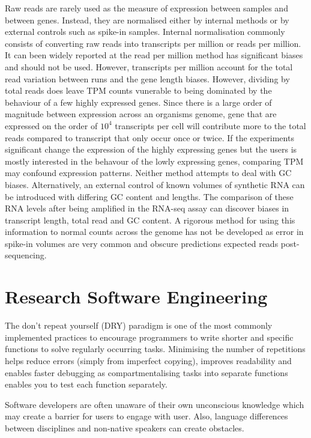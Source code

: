 \documentclass[../main.tex]{subfiles}
\begin{document}
Raw reads are rarely used as the measure of expression between samples and between genes. Instead, they are normalised either by internal methods or by external controls such as spike-in samples. Internal normalisation commonly consists of converting raw reads into transcripts per million or reads per million. It can been widely reported at the read per million method has significant biases and should not be used. However, transcripts per million account for the total read variation between runs and the gene length biases. However, dividing by total reads does leave TPM counts vunerable to being dominated by the behaviour of a few highly expressed genes. Since there is a large order of magnitude between expression across an organisms genome, gene that are expressed on the order of $10^4$ transcripts per cell will contribute more to the total reads compared to transcript that only occur once or twice. If the experiments significant change the expression of the highly expressing genes but the users is mostly interested in the behavour of the lowly expressing genes, comparing TPM may confound expression patterns. Neither method attempts to deal with GC biases. Alternatively, an external control of known volumes of synthetic RNA can be introduced with differing GC content and lengths. The comparison of these RNA levels after being amplified in the RNA-seq assay can discover biases in transcript length, total read and GC content. A rigorous method for using this information to normal counts across the genome has not be developed as error in spike-in volumes are very common and obscure predictions expected reads post-sequencing.

\section{Research Software Engineering}

The don't repeat yourself (DRY) paradigm is one of the most commonly implemented practices to encourage programmers to write shorter and specific functions to solve regularly occurring tasks. Minimising the number of repetitions helps reduce errors (simply from imperfect copying), improves readability and enables faster debugging as compartmentalising tasks into separate functions enables you to test each function separately.

Software developers are often unaware of their own unconscious knowledge which may create a barrier for users to engage with user. 
Also, language differences between disciplines and non-native speakers can create obstacles.
\end{document}
